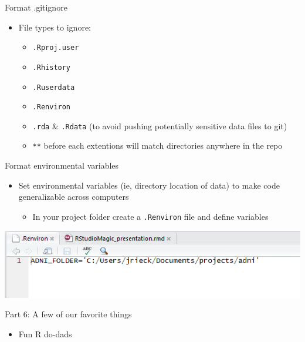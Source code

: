 \documentclass[
  ignorenonframetext,
]{beamer}
\providecommand{\tightlist}{%
  \setlength{\itemsep}{0pt}\setlength{\parskip}{0pt}}
\begin{document}
\begin{frame}[fragile]{Format .gitignore}
\protect\hypertarget{format-.gitignore}{}

\begin{itemize}
\tightlist
\item
  File types to ignore:

  \begin{itemize}
  \tightlist
  \item
    \texttt{.Rproj.user}
  \item
    \texttt{.Rhistory}
  \item
    \texttt{.Ruserdata}
  \item
    \texttt{.Renviron}
  \item
    \texttt{.rda} \& \texttt{.Rdata} (to avoid pushing potentially
    sensitive data files to git)
  \item
    \texttt{**} before each extentions will match directories anywhere
    in the repo
  \end{itemize}
\end{itemize}

\end{frame}

\begin{frame}[fragile]{Format environmental variables}
\protect\hypertarget{format-environmental-variables}{}

\begin{itemize}
\tightlist
\item
  Set environmental variables (ie, directory location of data) to make
  code generalizable across computers

  \begin{itemize}
  \tightlist
  \item
    In your project folder create a \texttt{.Renviron} file and define
    variables
  \end{itemize}
\end{itemize}

\includegraphics{../external/images/rstudio_setup_project_environ.PNG}

\end{frame}

\begin{frame}{Part 6: A few of our favorite things}
\protect\hypertarget{part-6-a-few-of-our-favorite-things}{}

\begin{itemize}
\tightlist
\item
  Fun R do-dads
\end{itemize}

\end{frame}
\end{document}
